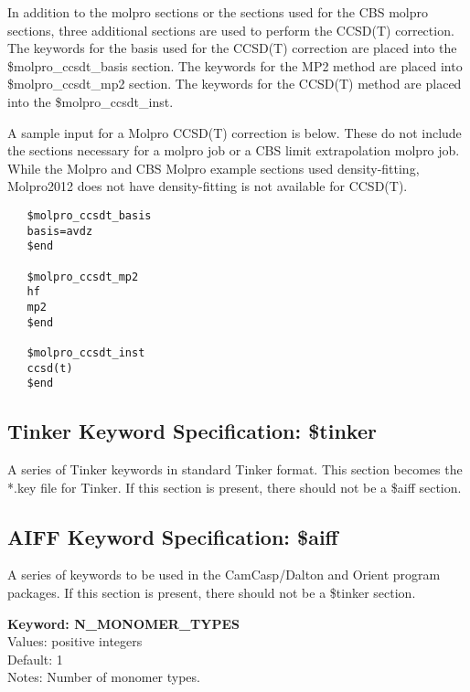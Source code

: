 \documentclass[11pt,letterpaper]{article}
\begin{document}
\begin{spacing}{1.0}
In addition to the molpro sections or the sections used for the CBS molpro sections, three additional sections are used 
to perform the CCSD(T) correction. The keywords for the basis used for the CCSD(T) correction are
placed into the \$molpro\_ccsdt\_basis section. The keywords for the MP2 method are placed into \$molpro\_ccsdt\_mp2 section.
The keywords for the CCSD(T) method are placed into the \$molpro\_ccsdt\_inst.

A sample input for a Molpro CCSD(T) correction is below. These do not include the sections necessary for a molpro job or a 
CBS limit extrapolation molpro job. While the Molpro and CBS Molpro example
 sections used density-fitting, 
Molpro2012 does not have
density-fitting is not available for CCSD(T).

\begin{verbatim}
   $molpro_ccsdt_basis
   basis=avdz
   $end

   $molpro_ccsdt_mp2
   hf
   mp2
   $end

   $molpro_ccsdt_inst
   ccsd(t)
   $end
\end{verbatim}






\subsection{Tinker Keyword Specification: \$tinker \label{sec-tinker}}
   	A series of Tinker keywords in standard Tinker format.  This
	section becomes the *.key file for Tinker.  If this section is
        present, there should not be a \$aiff section.

\subsection{AIFF Keyword Specification: \$aiff}
   	A series of keywords to be used in the CamCasp/Dalton and Orient
        program packages.  If this section is
        present, there should not be a \$tinker section.

\vspace{3mm}
\noindent
\textbf{Keyword: N\_MONOMER\_TYPES} \\
Values:  positive integers\\
Default: 1\\
Notes:  Number of monomer types. \\



\end{spacing}
\end{document}
